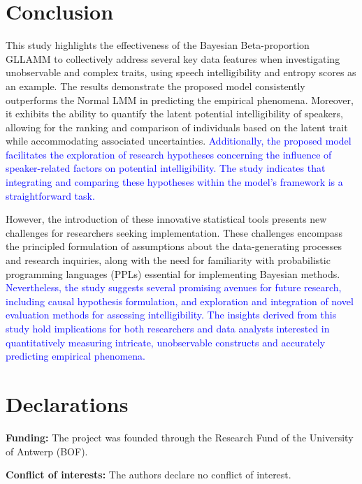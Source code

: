 \documentclass[
  authoryear,
  preprint,
  1p]{elsarticle}
\begin{document}
\section{Conclusion}\label{sec-conclusion}

This study highlights the effectiveness of the Bayesian Beta-proportion
GLLAMM to collectively address several key data features when
investigating unobservable and complex traits, using speech
intelligibility and entropy scores as an example. The results
demonstrate the proposed model consistently outperforms the Normal LMM
in predicting the empirical phenomena. Moreover, it exhibits the ability
to quantify the latent potential intelligibility of speakers, allowing
for the ranking and comparison of individuals based on the latent trait
while accommodating associated uncertainties. \textcolor{blue}{Additionally, the proposed
model facilitates the exploration of research hypotheses concerning the
influence of speaker-related factors on potential intelligibility. The
study indicates that integrating and comparing these hypotheses within
the model's framework is a straightforward task.}

However, the introduction of these innovative statistical tools presents
new challenges for researchers seeking implementation. These challenges
encompass the principled formulation of assumptions about the
data-generating processes and research inquiries, along with the need
for familiarity with probabilistic programming languages (PPLs)
essential for implementing Bayesian methods. \textcolor{blue}{Nevertheless, the study
suggests several promising avenues for future research, including causal
hypothesis formulation, and exploration and integration of novel
evaluation methods for assessing intelligibility. The insights derived
from this study hold implications for both researchers and data analysts
interested in quantitatively measuring intricate, unobservable
constructs and accurately predicting empirical phenomena.}

\newpage{}

\section*{Declarations}\label{declarations}

\textbf{Funding:} The project was founded through the Research Fund of
the University of Antwerp (BOF).

\textbf{Conflict of interests:} The authors declare no conflict of
interest.
\end{document}
